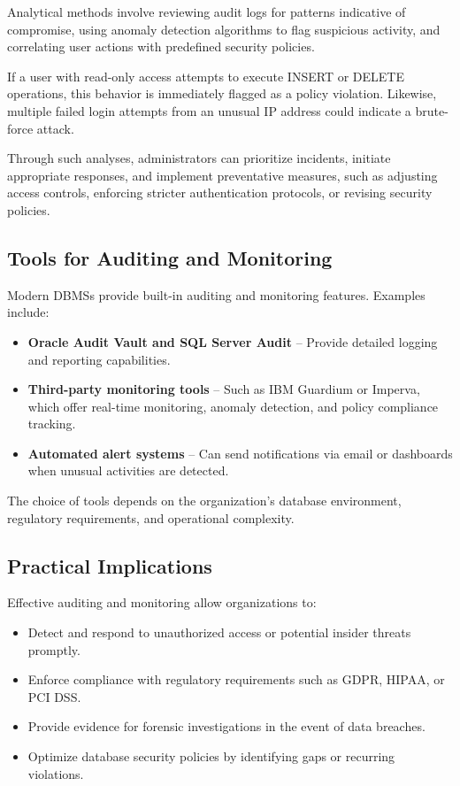 \documentclass[12pt,a4paper]{article}
\begin{document}
Analytical methods involve reviewing audit logs for patterns indicative of compromise, using anomaly detection algorithms to flag suspicious activity, and correlating user actions with predefined security policies.

\begin{example}
If a user with read-only access attempts to execute INSERT or DELETE operations, this behavior is immediately flagged as a policy violation. Likewise, multiple failed login attempts from an unusual IP address could indicate a brute-force attack.
\end{example}

Through such analyses, administrators can prioritize incidents, initiate appropriate responses, and implement preventative measures, such as adjusting access controls, enforcing stricter authentication protocols, or revising security policies.

\subsection{Tools for Auditing and Monitoring}

Modern DBMSs provide built-in auditing and monitoring features. Examples include:

\begin{itemize}
  \item \textbf{Oracle Audit Vault and SQL Server Audit} -- Provide detailed logging and reporting capabilities.
  \item \textbf{Third-party monitoring tools} -- Such as IBM Guardium or Imperva, which offer real-time monitoring, anomaly detection, and policy compliance tracking.
  \item \textbf{Automated alert systems} -- Can send notifications via email or dashboards when unusual activities are detected.
\end{itemize}

The choice of tools depends on the organization's database environment, regulatory requirements, and operational complexity.

\subsection{Practical Implications}

Effective auditing and monitoring allow organizations to:

\begin{itemize}
  \item Detect and respond to unauthorized access or potential insider threats promptly.
  \item Enforce compliance with regulatory requirements such as GDPR, HIPAA, or PCI DSS.
  \item Provide evidence for forensic investigations in the event of data breaches.
  \item Optimize database security policies by identifying gaps or recurring violations.
\end{itemize}
\end{document}
